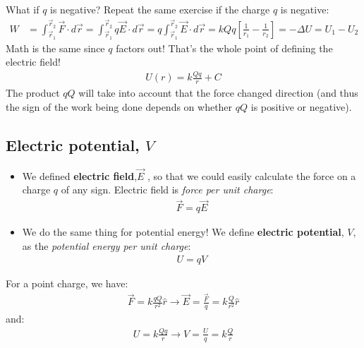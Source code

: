 \documentclass[aspectratio=169,
hyperref={colorlinks,urlcolor=blue}
]{beamer}
\begin{document}


\begin{frame}{What if $q$ is negative?}
Repeat the same exercise if the charge $q$ is negative:
\begin{align*}
W&=\int_{\vec r_1}^{\vec r_2}\vec F\cdot d\vec r = \int_{\vec r_1}^{\vec r_2}q\vec E\cdot d\vec r = q\int_{\vec r_1}^{\vec r_2}\vec E\cdot d\vec r =kQq\left[ \frac{1}{r_1}-\frac{1}{r_2} \right] = -\Delta U = U_1 - U_2
\end{align*}
Math is the same since $q$ factors out! That’s the whole point of defining the electric field!
\begin{align*}
\boxed{U(r) = k\frac{Qq}{r} +C}
\end{align*}
The product $qQ$ will take into account that the force changed direction (and thus the sign of the work being done depends on whether $qQ$ is positive or negative).
\end{frame}



\subsection{Electric potential, $V$}
\label{subsec:electricalpotentialv}
{
\begin{itemize}
\item We defined \textbf{electric field},$ \vec E$ , so that we could easily calculate the force on a charge $q$ of any sign. Electric field is \textit{force per unit charge}:
\begin{align*}
\vec F = q \vec E
\end{align*}
\item We do the same thing for potential energy! We define \textbf{electric potential}, $V$, as the \textit{potential energy per unit charge}:
\begin{align*}
U = q V
\end{align*}
\end{itemize}
}{
For a point charge, we have:
\begin{align*}
\vec F = k\frac{qQ}{r^2}\hat r \rightarrow \vec E = \frac{\vec F}{q}=k\frac{Q}{r^2}\hat r
\end{align*}
and:
\begin{align*}
U = k\frac{Qq}{r} \rightarrow V =\frac{U}{q}= k\frac{Q}{r}
\end{align*}
}
\end{document}
